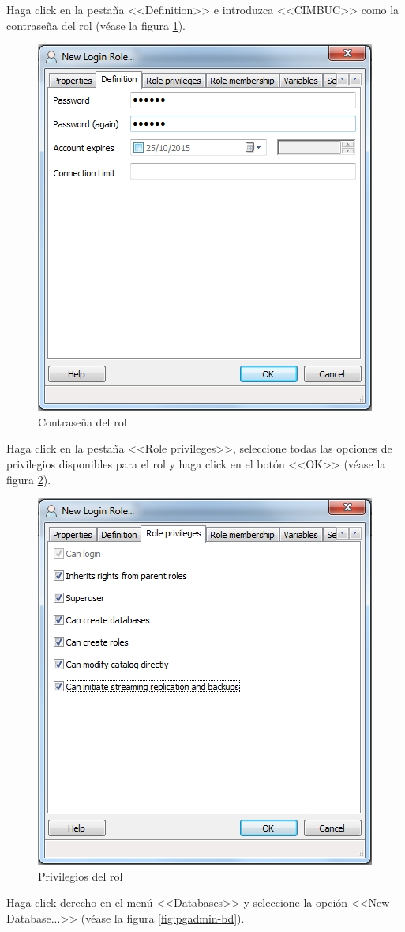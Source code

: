 Haga click en la pesta\~{n}a <<Definition>> e introduzca <<CIMBUC>> como la contrase\~{n}a del rol (v\'{e}ase la figura \ref{fig:pgadmin-rol-clave}).

\begin{figure}[H]
  \centering
  \includegraphics[width=.45\linewidth]{./img/pgadmin-rol-clave.jpg}
\caption[]{Contrase\~{n}a del rol\label{fig:pgadmin-rol-clave}}
\end{figure}

Haga click en la pesta\~{n}a <<Role privileges>>, seleccione todas las opciones de privilegios disponibles para el rol y haga click en el bot\'{o}n <<OK>> (v\'{e}ase la figura \ref{fig:pgadmin-rol-privilegios}).

\begin{figure}[H]
  \centering
  \includegraphics[width=.45\linewidth]{./img/pgadmin-rol-privilegios.jpg}
\caption[]{Privilegios del rol\label{fig:pgadmin-rol-privilegios}}
\end{figure}

\newpage

Haga click derecho en el men\'{u} <<Databases>> y seleccione la opci\'{o}n <<New Database...>> (v\'{e}ase la figura \ref{fig:pgadmin-bd}).

